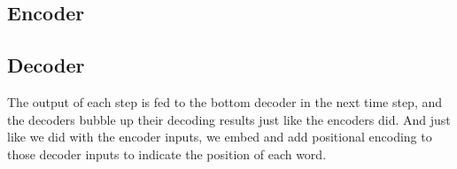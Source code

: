 






\subsection{Encoder}

\subsection{Decoder}
The output of each step is fed to the bottom decoder in the next time step, and the decoders bubble up their decoding results just like the encoders did. And just like we did with the encoder inputs, we embed and add positional encoding to those decoder inputs to indicate the position of each word.

